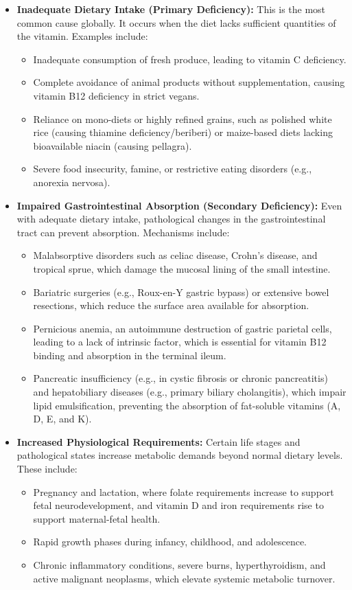 \begin{itemize}
    \item \textbf{Inadequate Dietary Intake (Primary Deficiency):} This is the most common cause globally. It occurs when the diet lacks sufficient quantities of the vitamin. Examples include:
    \begin{itemize}
        \item Inadequate consumption of fresh produce, leading to vitamin C deficiency.
        \item Complete avoidance of animal products without supplementation, causing vitamin B12 deficiency in strict vegans.
        \item Reliance on mono-diets or highly refined grains, such as polished white rice (causing thiamine deficiency/beriberi) or maize-based diets lacking bioavailable niacin (causing pellagra).
        \item Severe food insecurity, famine, or restrictive eating disorders (e.g., anorexia nervosa).
    \end{itemize}

    \item \textbf{Impaired Gastrointestinal Absorption (Secondary Deficiency):} Even with adequate dietary intake, pathological changes in the gastrointestinal tract can prevent absorption. Mechanisms include:
    \begin{itemize}
        \item Malabsorptive disorders such as celiac disease, Crohn's disease, and tropical sprue, which damage the mucosal lining of the small intestine.
        \item Bariatric surgeries (e.g., Roux-en-Y gastric bypass) or extensive bowel resections, which reduce the surface area available for absorption.
        \item Pernicious anemia, an autoimmune destruction of gastric parietal cells, leading to a lack of intrinsic factor, which is essential for vitamin B12 binding and absorption in the terminal ileum.
        \item Pancreatic insufficiency (e.g., in cystic fibrosis or chronic pancreatitis) and hepatobiliary diseases (e.g., primary biliary cholangitis), which impair lipid emulsification, preventing the absorption of fat-soluble vitamins (A, D, E, and K).
    \end{itemize}

    \item \textbf{Increased Physiological Requirements:} Certain life stages and pathological states increase metabolic demands beyond normal dietary levels. These include:
    \begin{itemize}
        \item Pregnancy and lactation, where folate requirements increase to support fetal neurodevelopment, and vitamin D and iron requirements rise to support maternal-fetal health.
        \item Rapid growth phases during infancy, childhood, and adolescence.
        \item Chronic inflammatory conditions, severe burns, hyperthyroidism, and active malignant neoplasms, which elevate systemic metabolic turnover.
    \end{itemize}


\end{itemize}
